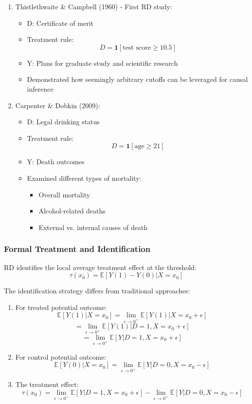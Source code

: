 \begin{enumerate}
    \item Thistlethwaite \& Campbell (1960) - First RD study:
    \begin{itemize}
        \item D: Certificate of merit
        \item Treatment rule: \[D = \mathbf{1}[\text{test score} \geq 10.5]\]
        \item Y: Plans for graduate study and scientific research
        \item Demonstrated how seemingly arbitrary cutoffs can be leveraged for causal inference
    \end{itemize}

    \item Carpenter \& Dobkin (2009):
    \begin{itemize}
        \item D: Legal drinking status
        \item Treatment rule: \[D = \mathbf{1}[\text{age} \geq 21]\]
        \item Y: Death outcomes
        \item Examined different types of mortality:
        \begin{itemize}
            \item Overall mortality
            \item Alcohol-related deaths
            \item External vs. internal causes of death
        \end{itemize}
    \end{itemize}
\end{enumerate}

\subsubsection{Formal Treatment and Identification}

RD identifies the local average treatment effect at the threshold:
\[\tau(x_0) = \mathbb{E}[Y(1) - Y(0)|X=x_0]\]

The identification strategy differs from traditional approaches:

\begin{enumerate}
    \item For treated potential outcome:
    \[\mathbb{E}[Y(1)|X=x_0] = \lim_{\epsilon \to 0^+} \mathbb{E}[Y(1)|X=x_0+\epsilon]\]
    \[= \lim_{\epsilon \to 0^+} \mathbb{E}[Y(1)|D=1, X=x_0+\epsilon]\]
    \[= \lim_{\epsilon \to 0^+} \mathbb{E}[Y|D=1, X=x_0+\epsilon]\]

    \item For control potential outcome:
    \[\mathbb{E}[Y(0)|X=x_0] = \lim_{\epsilon \to 0^+} \mathbb{E}[Y|D=0, X=x_0-\epsilon]\]

    \item The treatment effect:
    \[\tau(x_0) = \lim_{\epsilon \to 0^+} \mathbb{E}[Y|D=1, X=x_0+\epsilon] - \lim_{\epsilon \to 0^+} \mathbb{E}[Y|D=0, X=x_0-\epsilon]\]
\end{enumerate}

